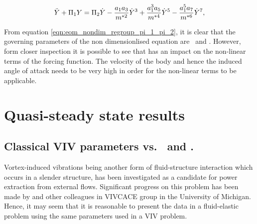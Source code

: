   \begin{equation}
  \label{eqn:eom_nondim_regroup_pi_1_pi_2}
  \ddot{Y} + \Pi_1 Y = \Pi_2 \dot{Y} - \frac{a_1a_3}{m^{*2}}\dot{Y}^3 + \frac{a_1^3a_5}{m^{*4}}\dot{Y}^5 - \frac{a_1^5a_7}{m^{*6}}\dot{Y}^7,
  \end{equation} 
  
From equation \ref{eqn:eom_nondim_regroup_pi_1_pi_2}, it is clear that the governing parameters of the non dimensionlised equation are \massstiff \ \massdamp and \mstar. However, form closer inspection it is possible to see that \mstar has an impact on the non-linear terms of the forcing function. The velocity of the body and hence the induced angle of attack needs to be very high in order for the non-linear terms to be applicable. 

\section{Quasi-steady state results}
\label{sec:qss_results} 

\subsection{Classical VIV parameters vs. \massstiff \ and \massdamp.}
\label{subsec:compare_data}


Vortex-induced vibrations being another form of fluid-structure interaction which occurs in a slender structure, has been investigated as a candidate for power extraction from external flows. Significant progress on this problem has been made by \cite{Bernitsas2008a-concept,Bernitsas2009,Raghavan2010a,Lee2011b} and other colleagues in VIVCACE group in the University of Michigan. Hence, it may seem that it is reasonable to present the data in a fluid-elastic problem using the same parameters used in a VIV problem.



